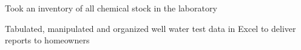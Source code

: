 \begin{job}

  \begin{accomplishments}
    \item Took an inventory of all chemical stock in the laboratory
    \item Tabulated, manipulated and organized well water test data in Excel to
    deliver reports to homeowners
  \end{accomplishments}
\end{job}
